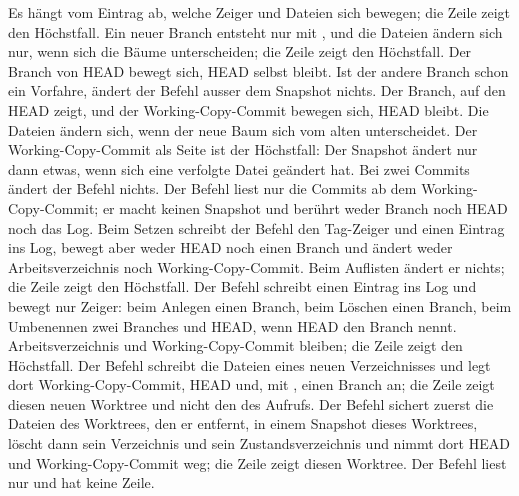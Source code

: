 \startplacetable[title={Was ein Befehl in seiner Zone bewegt},reference=tab:zones]
\startxtable[frame=off,option=stretch]
\startxrow[topframe=on,bottomframe=on]
 \stopxcell
{} \stopxcell
\stopxrow
\startxrow
\startxcell {} \stopxcell
\startxcell Es hängt vom Eintrag ab, welche Zeiger und Dateien sich bewegen; die Zeile zeigt den Höchstfall. \stopxcell
\stopxrow
\startxrow
\startxcell {} \stopxcell
\startxcell Ein neuer Branch entsteht nur mit , und die Dateien ändern sich nur, wenn sich die
Bäume unterscheiden; die Zeile zeigt den Höchstfall. \stopxcell
\stopxrow
\startxrow
\startxcell {} \stopxcell
\startxcell Der Branch von HEAD bewegt sich, HEAD selbst bleibt. Ist der andere Branch schon ein Vorfahre,
ändert der Befehl ausser dem Snapshot nichts. \stopxcell
\stopxrow
\startxrow
\startxcell {} \stopxcell
\startxcell Der Branch, auf den HEAD zeigt, und der Working-Copy-Commit bewegen sich, HEAD bleibt. Die
Dateien ändern sich, wenn der neue Baum sich vom alten unterscheidet. \stopxcell
\stopxrow
\startxrow
\startxcell {} \stopxcell
\startxcell Der Working-Copy-Commit als Seite ist der Höchstfall: Der Snapshot ändert nur dann etwas, wenn
sich eine verfolgte Datei geändert hat. Bei zwei Commits ändert der Befehl nichts. \stopxcell
\stopxrow
\startxrow
\startxcell {} \stopxcell
\startxcell Der Befehl liest nur die Commits ab dem Working-Copy-Commit; er macht keinen Snapshot und
berührt weder Branch noch HEAD noch das Log. \stopxcell
\stopxrow
\startxrow
\startxcell {} \stopxcell
\startxcell Beim Setzen schreibt der Befehl den Tag-Zeiger und einen Eintrag ins Log, bewegt aber weder HEAD
noch einen Branch und ändert weder Arbeitsverzeichnis noch Working-Copy-Commit. Beim Auflisten
ändert er nichts; die Zeile zeigt den Höchstfall. \stopxcell
\stopxrow
\startxrow
\startxcell {} \stopxcell
\startxcell Der Befehl schreibt einen Eintrag ins Log und bewegt nur Zeiger: beim Anlegen einen Branch, beim
Löschen einen Branch, beim Umbenennen zwei Branches und HEAD, wenn HEAD den Branch nennt.
Arbeitsverzeichnis und Working-Copy-Commit bleiben; die Zeile zeigt den Höchstfall. \stopxcell
\stopxrow
\startxrow
\startxcell {} \stopxcell
\startxcell Der Befehl schreibt die Dateien eines neuen Verzeichnisses und legt dort Working-Copy-Commit,
HEAD und, mit , einen Branch an; die Zeile zeigt diesen neuen Worktree und nicht den
des Aufrufs. \stopxcell
\stopxrow
\startxrow
\startxcell {} \stopxcell
\startxcell Der Befehl sichert zuerst die Dateien des Worktrees, den er entfernt, in einem Snapshot dieses
Worktrees, löscht dann sein Verzeichnis und sein Zustandsverzeichnis und nimmt dort HEAD und
Working-Copy-Commit weg; die Zeile zeigt diesen Worktree. \stopxcell
\stopxrow
\startxrow[bottomframe=on]
\startxcell {} \stopxcell
\startxcell Der Befehl liest nur und hat keine Zeile. \stopxcell
\stopxrow
\stopxtable
\stopplacetable

